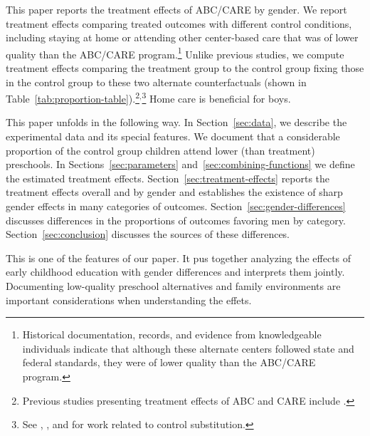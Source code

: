 This paper reports the treatment effects of ABC/CARE by gender. We report treatment effects comparing treated outcomes with different control conditions, including staying at home or attending other center-based care that was of lower quality than the ABC/CARE program.\footnote{Historical documentation, records, and evidence from knowledgeable individuals indicate that although these alternate centers followed state and federal standards, they were of lower quality than the ABC/CARE program.} Unlike previous studies, we compute treatment effects comparing the treatment group to the control group fixing those in the control group to these two alternate counterfactuals (shown in Table~\ref{tab:proportion-table}).\footnote{Previous studies presenting treatment effects of ABC and CARE include \citet{Ramey_etal_1985_Project-CARE_TiECSE, Clarke_Campbell_1998_ABC_Comparison_ECRQ,Campbell_Pungello_etal_2001_DP,Campbell_Ramey_etal_2002_ADS,Campbell_Wasik_etal_2008_ECRQ,Campbell_Conti_etal_2014_EarlyChildhoodInvestments}.}$^,$\footnote{See \cite{Heckman_1992_randomization}, \cite{Heckman_Hohmann_etal_2000_QJE}, and \cite{Kline_Walters_2016_QJE} for work related to control substitution.} Home care is beneficial for boys. 

This paper unfolds in the following way. In Section~\ref{sec:data}, we describe the experimental data and its special features. We document that a considerable proportion of the control group children attend lower (than treatment) preschools. In Sections~\ref{sec:parameters} and~\ref{sec:combining-functions} we define the estimated treatment effects. Section~\ref{sec:treatment-effects} reports the treatment effects overall and by gender and establishes the existence of sharp gender effects in many categories of outcomes. Section~\ref{sec:gender-differences} discusses differences in the proportions of outcomes favoring men by category. Section~\ref{sec:conclusion} discusses the sources of these differences.

This is one of the features of our paper. It pus together analyzing the effects of early childhood education with gender differences and interprets them jointly. Documenting low-quality preschool alternatives and family environments are important considerations when understanding the effets.

